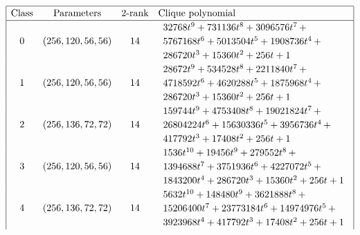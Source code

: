 \documentclass[12pt,a4paper]{article}
\begin{document}
\begin{table}[!bhpt] %
%
\small{}
\begin{align*}
\def\arraystretch{1.2}
\begin{array}{|cccl|}
\hline
\text{Class} &
\text{Parameters} &
\text{2-rank} &
\text{Clique polynomial}
\\
\hline
0 &
(256, 120, 56, 56) &
14 &
\begin{array}{l}
32768t^{9} + 731136t^{8} + 3096576t^{7}
\,+
\\
 5767168t^{6} + 5013504t^{5} + 1908736t^{4}
\,+
\\
 286720t^{3} + 15360t^{2} + 256t + 1
\end{array}
\\
1 &
(256, 120, 56, 56) &
14 &
\begin{array}{l}
28672t^{9} + 534528t^{8} + 2211840t^{7}
\,+
\\
 4718592t^{6} + 4620288t^{5} + 1875968t^{4}
\,+
\\
 286720t^{3} + 15360t^{2} + 256t + 1
\end{array}
\\
2 &
(256, 136, 72, 72) &
14 &
\begin{array}{l}
159744t^{9} + 4753408t^{8} + 19021824t^{7}
\,+
\\
 26804224t^{6} + 15630336t^{5} + 3956736t^{4}
\,+
\\
 417792t^{3} + 17408t^{2} + 256t + 1
\end{array}
\\
3 &
(256, 120, 56, 56) &
14 &
\begin{array}{l}
1536t^{10} + 19456t^{9} + 279552t^{8}
\,+
\\
 1394688t^{7} + 3751936t^{6} + 4227072t^{5}
\,+
\\
 1843200t^{4} + 286720t^{3} + 15360t^{2} + 256t + 1
\end{array}
\\
4 &
(256, 136, 72, 72) &
14 &
\begin{array}{l}
5632t^{10} + 148480t^{9} + 3621888t^{8}
\,+
\\
 15206400t^{7} + 23773184t^{6} + 14974976t^{5}
\,+
\\
 3923968t^{4} + 417792t^{3} + 17408t^{2} + 256t + 1
\end{array}
\\

\end{array}
\end{align*}
\end{table}
\end{document}
